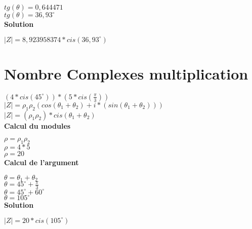 $tg(\theta) = 0,644471$ \\

$tg(\theta) = 36,93^{\circ}$ \\


\vspace{6mm}
\textbf{Solution}
\vspace{5mm}

$|Z| = 8,923958374*cis(36,93^{\circ})$ \\

\newpage
\section{Nombre Complexes multiplication}
\vspace{3mm} %

$(4 * cis(45^{\circ} )) * (5 * cis(\frac{\pi}{3}))$ \\

$|Z| = \rho_{1}\rho_{2}( cos(\theta_{1} + \theta_{2}) + i*(sin(\theta_{1} + \theta_{2})) )$ \\

$|Z| = (\rho_{1}\rho_{2})*cis(\theta_{1} + \theta_{2})$ \\


\vspace{6mm}
\textbf{Calcul du modules}
\vspace{5mm}

$\rho = \rho_{1}\rho_{2}$ \\

$\rho = 4*5 $ \\

$\rho = 20 $ \\

\vspace{6mm}
\textbf{Calcul de l'argument}
\vspace{5mm}

$\theta = \theta_{1}+\theta_{2}$ \\

$\theta = 45^{\circ} + \frac{\pi}{3}$ \\

$\theta = 45^{\circ} + 60^{\circ}$ \\

$\theta = 105^{\circ}$ \\

\vspace{6mm}
\textbf{Solution}
\vspace{5mm}

$|Z| = 20 * cis(105^{\circ})$

